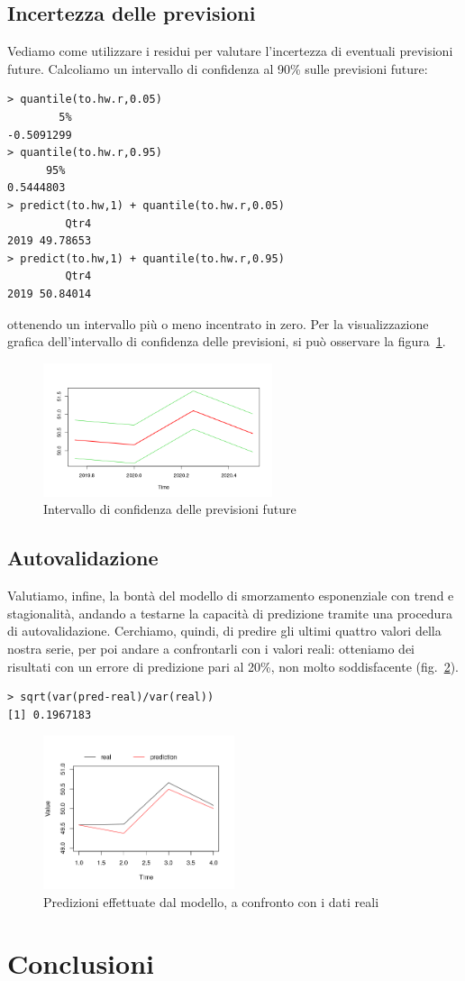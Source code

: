 \documentclass[11pt,a4paper,oneside]{article}
\begin{document}
\subsection{Incertezza delle previsioni}
Vediamo come utilizzare i residui per valutare l'incertezza di eventuali previsioni future. Calcoliamo un intervallo di confidenza al 90\% sulle previsioni future:
\begin{verbatim}
> quantile(to.hw.r,0.05)
        5% 
-0.5091299 
> quantile(to.hw.r,0.95)
      95% 
0.5444803
> predict(to.hw,1) + quantile(to.hw.r,0.05)
         Qtr4
2019 49.78653
> predict(to.hw,1) + quantile(to.hw.r,0.95)
         Qtr4
2019 50.84014
\end{verbatim}
ottenendo un intervallo più o meno incentrato in zero. Per la visualizzazione grafica dell'intervallo di confidenza delle previsioni, si può osservare la figura~\ref{fig:confidenza}.
\begin{figure}[h]
\centering
\includegraphics[width=0.6\textwidth]{images/confidenza}
\caption{Intervallo di confidenza delle previsioni future}
\label{fig:confidenza}
\end{figure}

\subsection{Autovalidazione}
Valutiamo, infine, la bontà del modello di smorzamento esponenziale con trend e stagionalità, andando a testarne la capacità di predizione tramite una procedura di autovalidazione. Cerchiamo, quindi, di predire gli ultimi quattro valori della nostra serie, per poi andare a confrontarli con i valori reali: otteniamo dei risultati con un errore di predizione pari al 20\%, non molto soddisfacente (fig.~\ref{fig:prediction}). 
\begin{verbatim}
> sqrt(var(pred-real)/var(real))
[1] 0.1967183
\end{verbatim}
\begin{figure}[h]
\centering
\includegraphics[width=0.5\textwidth]{images/prediction}
\caption{Predizioni effettuate dal modello, a confronto con i dati reali}
\label{fig:prediction}
\end{figure}

\section{Conclusioni}
\end{document}
